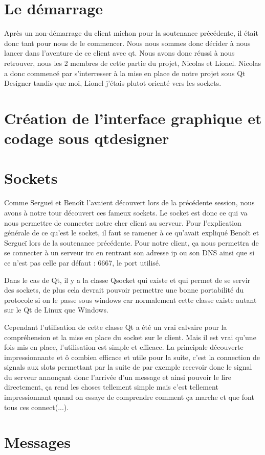 \section{Le démarrage}

Après un non-démarrage du client michon pour la soutenance précédente, il était donc tant pour nous de le commencer. Nous nous sommes donc décider à nous lancer dans l'aventure de ce client avec qt. Nous avons donc réussi à nous retrouver, nous les 2 membres de cette partie du projet, Nicolas et Lionel. Nicolas a donc commencé par s'interresser à la mise en place de notre projet sous Qt Designer tandis que moi, Lionel j'étais plutot orienté vers les sockets.


\section{Création de l'interface graphique et codage sous qtdesigner}



\section{Sockets}

Comme Sergueï et Benoît l'avaient découvert lors de la précédente session, nous avons à notre tour découvert ces fameux sockets.
Le socket est donc ce qui va nous permettre de connecter notre cher client au serveur. Pour l'explication générale de ce qu'est le socket, il faut se ramener à ce qu'avait expliqué Benoît et Sergueï lors de la soutenance précédente.
Pour notre client, ça nous permettra de se connecter à un serveur irc en rentrant son adresse ip ou son DNS ainsi que si ce n'est pas celle par défaut : 6667, le port utilisé.

Dans le cas de Qt, il y a la classe Qsocket qui existe et qui permet de se servir des sockets, de plus cela devrait pouvoir permettre une bonne portabilité du protocole si on le passe sous windows car normalement cette classe existe autant sur le Qt de Linux que Windows.

Cependant l'utilisation de cette classe Qt a été un vrai calvaire pour la compréhension et la mise en place du socket sur le client.
Mais il est vrai qu'une fois mis en place, l'utilisation est simple et efficace.
La principale découverte impressionnante et ô combien efficace et utile pour la suite, c'est la connection de signals aux slots permettant par la suite de par exemple recevoir donc le signal du serveur annonçant donc l'arrivée d'un message et ainsi pouvoir le lire directement, ça rend les choses tellement simple mais c'est tellement impressionnant quand on essaye de comprendre comment ça marche et que font tous ces connect(...).

\section{Messages}


